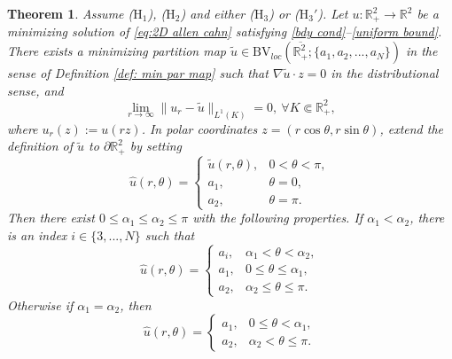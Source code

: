 \documentclass[leqno,11pt]{amsart}
\let\pa=\partial
\let\al=\alpha
\let\pa=\partial
\let\na=\nabla
\newtheorem{theorem}{Theorem}[section]
\theoremstyle{remark}
\newcommand{\BR}{\mathbb{R}}
\begin{document}
\begin{theorem}\label{main thm: cls of blow down}
    Assume ($\mathrm{H}_1$), ($\mathrm{H}_2$) and either ($\mathrm{H}_3$) or ($\mathrm{H}_3'$). Let $u:\BR_+^2\to \BR^2$ be a minimizing solution of \eqref{eq:2D allen cahn} satisfying \eqref{bdy cond}--\eqref{uniform bound}. There exists a minimizing partition map $\tilde{u}\in \mathrm{BV}_{loc}(\overline{\BR_+^2};\{a_1,a_2,...,a_N\})$ in the sense of Definition \ref{def: min par map} such that $\na \tilde{u}\cdot z=0$ in the distributional sense, and 
    \begin{equation*}
        \lim\limits_{r\to \infty} \|u_r-\tilde{u}\|_{L^1(K)}=0,\ \forall K\Subset \BR_+^2,
    \end{equation*}
    where $u_r(z):=u(rz)$. In polar coordinates $z=(r\cos\theta,r\sin\theta)$, extend the definition of $\tilde{u}$ to $\pa \BR_+^2$ by setting
    \begin{equation}\label{def of hatu}
        \hat{u}(r,\theta)=\begin{cases}
        \tilde{u}(r,\theta), & 0<\theta<\pi,\\
        a_1, & \theta=0,\\
        a_2, & \theta=\pi.
        \end{cases}
    \end{equation}
   Then there exist $0\leq \al_1\leq \al_2\leq \pi$ with the following properties. If $\al_1<\al_2$, there is an index $i\in\{3,...,N\}$ such that
       \begin{equation*}
        \hat{u}(r,\theta)=\begin{cases}
        a_i, &  \al_1<\theta<\al_2,\\
        a_1, & 0 \leq\theta\leq \al_1,\\
        a_2, & \al_2\leq \theta\leq \pi.
        \end{cases}
    \end{equation*}
    Otherwise if $\al_1=\al_2$, then
    \begin{equation*}
        \hat{u}(r,\theta)=\begin{cases}
        a_1, & 0\leq\theta< \al_1,\\
        a_2, & \al_2< \theta\leq \pi.
        \end{cases}
    \end{equation*}
    

\end{theorem}
\end{document}
